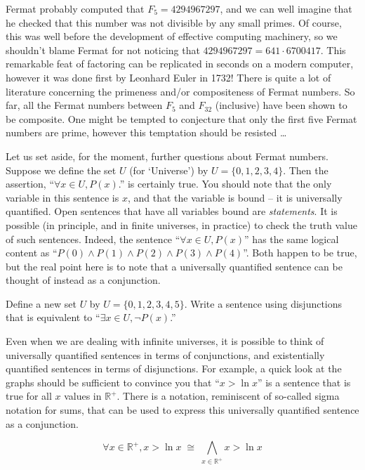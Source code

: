 Fermat probably computed that $F_5=4294967297$, and we can well imagine
that he checked that this number was not divisible by any small primes. 
Of course, this was well before the development of effective computing
machinery, so we shouldn't blame Fermat for not noticing that
$4294967297 = 641 \cdot 6700417$.  This remarkable feat of factoring 
can be replicated in seconds on a modern computer, however it was done
first by  Leonhard Euler in 1732!  
There is quite a lot of literature 
concerning the primeness and/or compositeness of Fermat numbers.  So
far, all the Fermat numbers between $F_5$ and $F_{32}$ (inclusive) have
been shown to be composite.  One might be tempted to conjecture that
only the first five Fermat numbers are prime, however this temptation
should be resisted \ldots  

Let us set aside, for the moment, further questions about Fermat numbers.
Suppose we define the set $U$ (for `Universe') by $U=\{0,1,2,3,4\}$.
Then the assertion, ``$\forall x \in U, P(x)$.'' is certainly true.
You should note that the only variable in this sentence is $x$, and
that the variable is bound -- it is universally quantified.  Open sentences
that have all variables bound are {\em statements}.  It is possible 
(in principle, and in finite universes, in practice) to check the 
truth value of such sentences.
Indeed, the sentence ``$\forall x \in U, P(x)$'' has the same logical content
as ``$P(0) \land P(1) \land P(2) \land P(3)  \land P(4)$''.  Both happen to be
true, but the real point here is to note that a universally quantified sentence
can be thought of instead as a conjunction.

\begin{exer}
Define a new set $U$ by $U=\{0,1,2,3,4,5\}$.  
Write a sentence using disjunctions
that is equivalent to ``$\exists x \in U, {\lnot}P(x)$.''
\end{exer}

Even when we are dealing with infinite universes, it is possible to
think of universally quantified sentences in terms of conjunctions,
and existentially quantified sentences in terms of disjunctions.  For
example, a quick look at the graphs should be sufficient to convince you
that ``$ x > \ln x $'' is a sentence that is true for all $x$ values in
${\mathbb R}^+$.  There is a notation, reminiscent of so-called sigma notation
for sums, that can be used to express this universally quantified sentence as
a conjunction.

\[
\forall x \in {\mathbb R}^+, x > \ln x \; \cong \; 
\bigwedge_{x \in {\mathbb R}^+} x > \ln x
\]

